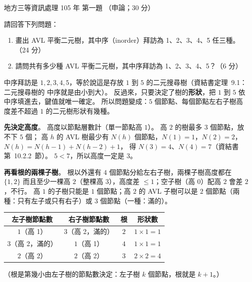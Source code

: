 \begin{pastexam}[label={px:df3-105-ds-01}]{地方三等資訊處理 105 年 第一題}
（申論；30 分）

請回答下列問題：
\begin{enumerate}[leftmargin=2.6em, labelsep=0.4em]
\item[㈠] 畫出 AVL 平衡二元樹，其中序（inorder）拜訪為 1、2、3、4、5 任三種。（24 分）
\item[㈡] 請問共有多少種 AVL 平衡二元樹，其中序拜訪為 1、2、3、4、5？（6 分）
\end{enumerate}
\end{pastexam}

\begin{pastsoln}
中序拜訪是 $1, 2, 3, 4, 5$，等於說這是存放 $1$ 到 $5$ 的二元搜尋樹（資結書定理~9.1：二元搜尋樹的
中序就是由小到大）。 反過來，只要決定了樹的\textbf{形狀}，把 $1$ 到 $5$ 依中序填進去，鍵值就唯一確定。
所以問題變成：$5$ 個節點、每個節點左右子樹高度差不超過 $1$ 的二元樹形狀有幾種。

\textbf{先決定高度}。 高度以節點層數計（單一節點高 $1$）。 高 $2$ 的樹最多 $3$ 個節點，放不下 $5$ 個；
高 $h$ 的 AVL 樹最少有 $N(h)$ 個節點，$N(1) = 1$，$N(2) = 2$，$N(h) = N(h-1) + N(h-2) + 1$，
得 $N(3) = 4$、$N(4) = 7$（資結書第~10.2.2~節）。 $5 < 7$，所以高度一定是 $3$。

\textbf{再看根的兩棵子樹}。 根以外還有 $4$ 個節點分給左右子樹，兩棵子樹高度都在 $\{1, 2\}$ 而且至少一棵高
$2$（整棵高 $3$），高度差 $\le 1$；空子樹（高 $0$）配高 $2$ 會差 $2$，不行。 高 $1$ 的子樹只能是
$1$ 個節點；高 $2$ 的 AVL 子樹可以是 $2$ 個節點（兩種：只有左子或只有右子）或 $3$ 個節點（一種：滿的）。
\begin{center}
\small
\begin{tabular}{cccc}
\toprule
左子樹節點數 & 右子樹節點數 & 根 & 形狀數 \\
\midrule
$1$（高 1） & $3$（高 2，滿的） & $2$ & $1 \times 1 = 1$ \\
$3$（高 2，滿的） & $1$（高 1） & $4$ & $1 \times 1 = 1$ \\
$2$（高 2） & $2$（高 2） & $3$ & $2 \times 2 = 4$ \\
\bottomrule
\end{tabular}
\end{center}
（根是第幾小由左子樹的節點數決定：左子樹 $k$ 個節點，根就是 $k + 1$。）


\end{pastsoln}
